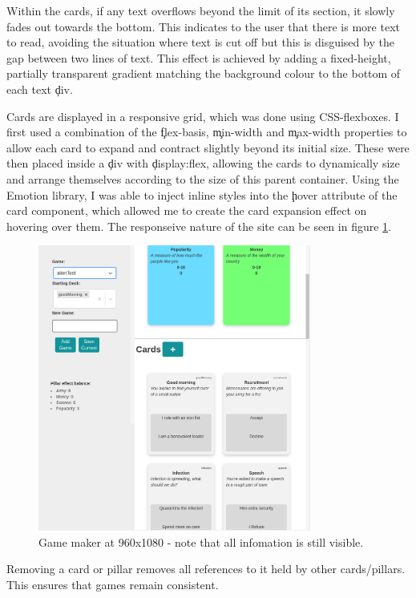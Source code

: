 Within the cards, if any text overflows beyond the limit of its section, it slowly fades out towards the bottom. This indicates to the user that there is more text to read, avoiding the situation where text is cut off but this is disguised by the gap between two lines of text. This effect is achieved by adding a fixed-height, partially transparent gradient matching the background colour to the bottom of each text \c{div}.

Cards are displayed in a responsive grid, which was done using CSS-flexboxes. I first used a combination of the \c{flex-basis}, \c{min-width} and \c{max-width} properties to allow each card to expand and contract slightly beyond its initial size. These were then placed inside a \c{div} with \c{display:flex}, allowing the cards to dynamically size and arrange themselves according to the size of this parent container. Using the Emotion\cite{Emotion} library, I was able to inject inline styles into the \c{hover} attribute of the card component, which allowed me to create the card expansion effect on hovering over them. The responseive nature of the site can be seen in figure \ref{fig:responsive}.

\begin{figure}[!h]
	\centering
	\includegraphics[width=0.8\textwidth]{./images/impl/responsive.png}
	\caption{Game maker at 960x1080 - note that all infomation is still visible.}
	\label{fig:responsive}
\end{figure}

Removing a card or pillar removes all references to it held by other cards/pillars. This ensures that games remain consistent.

